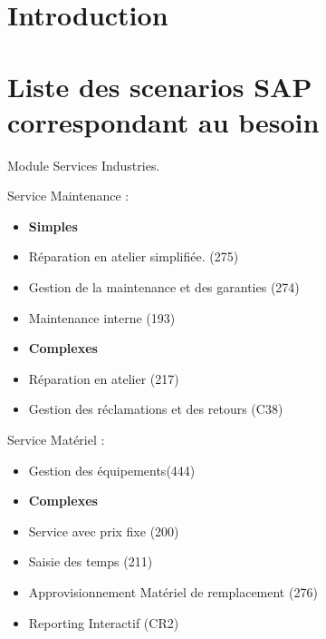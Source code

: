 \documentclass[a4paper]{article}
\begin{document}
\maketitle

\begin{abstract}
\end{abstract}

\section{Introduction}

\section{Liste des scenarios SAP correspondant au besoin}

Module Services Industries.

Service Maintenance : \\

\begin{itemize}
    \item \textbf{Simples}
    \item Réparation en atelier simplifiée. (275)
    \item Gestion de la maintenance et des garanties (274)
    \item Maintenance interne (193)
    \item \textbf{Complexes}
    \item Réparation en atelier (217)
    \item Gestion des réclamations et des retours (C38)
\end{itemize}

Service Matériel : \\

\begin{itemize}
    \item Gestion des équipements(444)
    \item \textbf{Complexes}    
    \item Service avec prix fixe (200)
    \item Saisie des temps (211)
    \item Approvisionnement Matériel de remplacement (276)
    \item Reporting Interactif (CR2)
\end{itemize}
\end{document}

